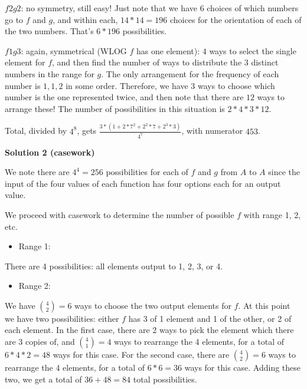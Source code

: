 \begin{enumerate}
 $f 2 g 2$: no symmetry, still easy! Just note that we have $6$ choices of which numbers go to $f$ and $g$, and within each, $14*14=196$ choices for the orientation of each of the two numbers. That's $6*196$ possibilities.

 $f 1 g 3$: again, symmetrical (WLOG $f$ has one element): $4$ ways to select the single element for $f$, and then find the number of ways to distribute the $3$ distinct numbers in the range for $g$. The only arrangement for the frequency of each number is ${1, 1, 2}$ in some order. Therefore, we have $3$ ways to choose which number is the one represented twice, and then note that there are $12$ ways to arrange these! The number of possibilities in this situation is $2 * 4 * 3 * 12$.

 Total, divided by $4^8$, gets $\frac{3 * (1 + 2 * 7^2 + 2^2 * 7 + 2^3 * 3)}{4^7}$, with numerator $\boxed{453}$.

 



\textbf{Solution 2 (casework)}

We note there are $4^4 = 256$ possibilities for each of $f$ and $g$ from $A$ to $A$ since the input of the four values of each function has four options each for an output value.

 We proceed with casework to determine the number of possible $f$ with range 1, 2, etc.

 
            \begin{itemize}
        \item Range 1:
            \end{itemize}
            There are 4 possibilities: all elements output to 1, 2, 3, or 4.

 
            \begin{itemize}
        \item Range 2:
            \end{itemize}
            We have ${{4}\choose {2}} = 6$ ways to choose the two output elements for $f$. At this point we have two possibilities: either $f$ has 3 of 1 element and 1 of the other, or 2 of each element. In the first case, there are 2 ways to pick the element which there are 3 copies of, and ${{4}\choose {1}} = 4$ ways to rearrange the 4 elements, for a total of $6 * 4 * 2 = 48$ ways for this case. For the second case, there are ${{4}\choose {2}} = 6$ ways to rearrange the 4 elements, for a total of $6 * 6 = 36$ ways for this case. Adding these two, we get a total of $36 + 48 = 84$ total possibilities.


\end{enumerate}

